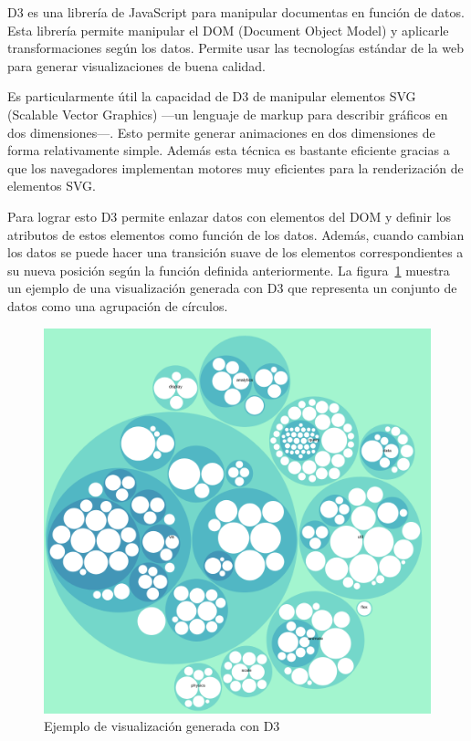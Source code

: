 D3 es una librería de JavaScript para manipular documentas en función de datos. Esta librería permite manipular el DOM (Document Object Model) y aplicarle transformaciones según los datos. Permite usar las tecnologías estándar de la web para generar visualizaciones de buena calidad.

Es particularmente útil la capacidad de D3 de manipular elementos SVG (Scalable Vector Graphics) ---un lenguaje de markup para describir gráficos en dos dimensiones---. Esto permite generar animaciones en dos dimensiones de forma relativamente simple. Además esta técnica es bastante eficiente gracias a que los navegadores implementan motores muy eficientes para la renderización de elementos SVG.

Para lograr esto D3 permite enlazar datos con elementos del DOM y definir los atributos de estos elementos como función de los datos. Además, cuando cambian los datos se puede hacer una transición suave de los elementos correspondientes a su nueva posición según la función definida anteriormente. La figura~\ref{fig:d3-ejemplo} muestra un ejemplo de una visualización generada con D3 que representa un conjunto de datos como una agrupación de círculos.

\begin{figure}[h]
    \centering
    \includegraphics[width=\textwidth]{imagenes/d3/ejemplo.png}
    \caption{Ejemplo de visualización generada con D3}
    \label{fig:d3-ejemplo}
\end{figure}
